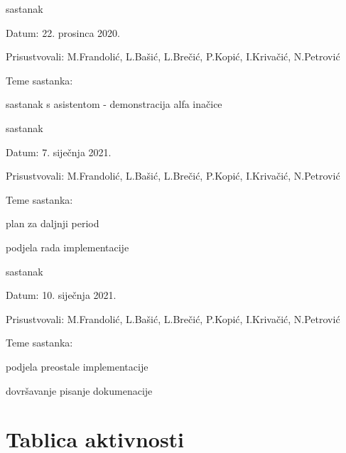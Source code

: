 \begin{packed_enum}
			\item sastanak
			\item[] \begin{packed_item}
				\item Datum: 22. prosinca 2020.
				\item Prisustvovali: M.Frandolić, L.Bašić, L.Brečić, P.Kopić, I.Krivačić, N.Petrović
				\item Teme sastanka:
				\begin{packed_item}
					\item sastanak s asistentom - demonstracija alfa inačice
				\end{packed_item}
			\end{packed_item}
		
			\item sastanak
			\item[] \begin{packed_item}
				\item Datum: 7. siječnja 2021.
				\item Prisustvovali: M.Frandolić, L.Bašić, L.Brečić, P.Kopić, I.Krivačić, N.Petrović
				\item Teme sastanka:
				\begin{packed_item}
					\item plan za daljnji period
					\item podjela rada implementacije
				\end{packed_item}
			\end{packed_item}
		
			\item sastanak
			\item[] \begin{packed_item}
				\item Datum: 10. siječnja 2021.
				\item Prisustvovali: M.Frandolić, L.Bašić, L.Brečić, P.Kopić, I.Krivačić, N.Petrović
				\item Teme sastanka:
				\begin{packed_item}
					\item podjela preostale implementacije
					\item dovršavanje pisanje dokumenacije
				\end{packed_item}
			\end{packed_item}
		
		\end{packed_enum}
		
		\eject
		\section*{Tablica aktivnosti}
			
